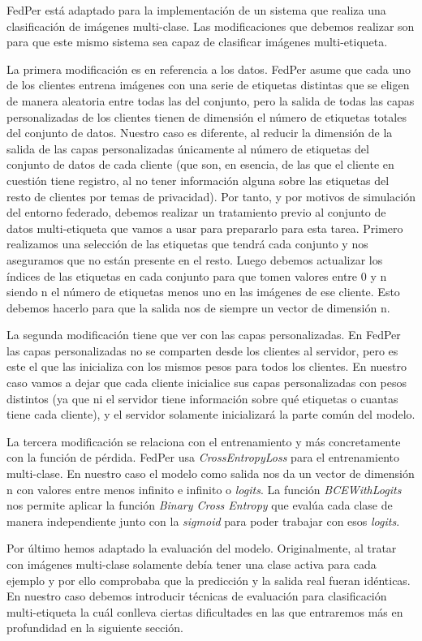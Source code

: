 FedPer está adaptado para la implementación de un sistema que realiza una clasificación de imágenes multi-clase. Las modificaciones que debemos realizar son para que este mismo sistema sea capaz de clasificar imágenes multi-etiqueta.

La primera modificación es en referencia a los datos. FedPer asume que cada uno de los clientes entrena imágenes con una serie de etiquetas distintas que se eligen de manera aleatoria entre todas las del conjunto, pero la salida de todas las capas personalizadas de los clientes tienen de dimensión el número de etiquetas totales del conjunto de datos. Nuestro caso es diferente, al reducir la dimensión de la salida de las capas personalizadas únicamente al número de etiquetas del conjunto de datos de cada cliente (que son, en esencia, de las que el cliente en cuestión tiene registro, al no tener información alguna sobre las etiquetas del resto de clientes por temas de privacidad). Por tanto, y por motivos de simulación del entorno federado, debemos realizar un tratamiento previo al conjunto de datos multi-etiqueta que vamos a usar para prepararlo para esta tarea. Primero realizamos una selección de las etiquetas que tendrá cada conjunto y nos aseguramos que no están presente en el resto. Luego debemos actualizar los índices de las etiquetas en cada conjunto para que tomen valores entre 0 y n siendo n el número de etiquetas menos uno en las imágenes de ese cliente. Esto debemos hacerlo para que la salida nos de siempre un vector de dimensión n.

La segunda modificación tiene que ver con las capas personalizadas. En FedPer las capas personalizadas no se comparten desde los clientes al servidor, pero es este el que las inicializa con los mismos pesos para todos los clientes. En nuestro caso vamos a dejar que cada cliente inicialice sus capas personalizadas con pesos distintos (ya que ni el servidor tiene información sobre qué etiquetas o cuantas tiene cada cliente), y el servidor solamente inicializará la parte común del modelo.

La tercera modificación se relaciona con el entrenamiento y más concretamente con la función de pérdida. FedPer usa \textit{CrossEntropyLoss} para el entrenamiento multi-clase. En nuestro caso el modelo como salida nos da un vector de dimensión n con valores entre menos infinito e infinito o \textit{logits}. La función \textit{BCEWithLogits} nos permite aplicar la función \textit{Binary Cross Entropy} que evalúa cada clase de manera independiente junto con la \textit{sigmoid} para poder trabajar con esos \textit{logits}.

Por último hemos adaptado la evaluación del modelo. Originalmente, al tratar con imágenes multi-clase solamente debía tener una clase activa para cada ejemplo y por ello comprobaba que la predicción y la salida real fueran idénticas. En nuestro caso debemos introducir técnicas de evaluación para clasificación multi-etiqueta la cuál conlleva ciertas dificultades en las que entraremos más en profundidad en la siguiente sección.